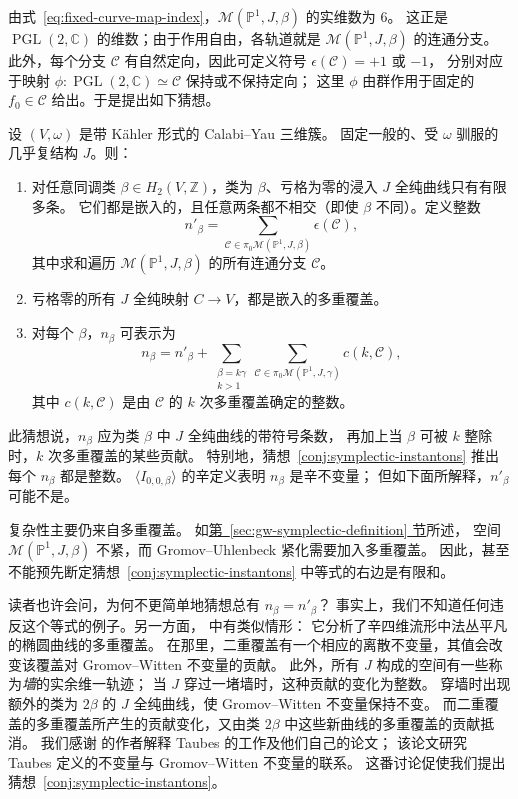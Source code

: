 由式~\eqref{eq:fixed-curve-map-index}，$\mathcal M(\mathbb P^1,J,\beta)$ 的实维数为 $6$。
这正是 $\operatorname{PGL}(2,\mathbb C)$ 的维数；由于作用自由，各轨道就是
$\mathcal M(\mathbb P^1,J,\beta)$ 的连通分支。
此外，每个分支 $\mathcal C$ 有自然定向，因此可定义符号 $\epsilon(\mathcal C)=+1$ 或 $-1$，
分别对应于映射 $\phi:\operatorname{PGL}(2,\mathbb C)\simeq\mathcal C$ 保持或不保持定向；
这里 $\phi$ 由群作用于固定的 $f_0\in\mathcal C$ 给出。于是提出如下猜想。
\begin{conjecture}\label{conj:symplectic-instantons}
设 $(V,\omega)$ 是带 Kähler 形式的 Calabi--Yau 三维簇。
固定一般的、受 $\omega$ 驯服的几乎复结构 $J$。则：
\begin{enumerate}[label=(\roman*)]
\item 对任意同调类 $\beta\in H_2(V,\mathbb Z)$，类为 $\beta$、亏格为零的浸入 $J$ 全纯曲线只有有限多条。
它们都是嵌入的，且任意两条都不相交（即使 $\beta$ 不同）。定义整数
\[
n'_\beta=\sum_{\mathcal C\in\pi_0\mathcal M(\mathbb P^1,J,\beta)}\epsilon(\mathcal C),
\]
其中求和遍历 $\mathcal M(\mathbb P^1,J,\beta)$ 的所有连通分支 $\mathcal C$。
\item 亏格零的所有 $J$ 全纯映射 $C\to V$，都是嵌入的多重覆盖。
\item 对每个 $\beta$，$n_\beta$ 可表示为
\[
n_\beta=n'_\beta+\sum_{\substack{\beta=k\gamma\\k>1}}
\sum_{\mathcal C\in\pi_0\mathcal M(\mathbb P^1,J,\gamma)}c(k,\mathcal C),
\]
其中 $c(k,\mathcal C)$ 是由 $\mathcal C$ 的 $k$ 次多重覆盖确定的整数。
\end{enumerate}
\end{conjecture}
此猜想说，$n_\beta$ 应为类 $\beta$ 中 $J$ 全纯曲线的带符号条数，
再加上当 $\beta$ 可被 $k$ 整除时，$k$ 次多重覆盖的某些贡献。
特别地，猜想~\ref{conj:symplectic-instantons} 推出每个 $n_\beta$ 都是整数。
$\langle I_{0,0,\beta}\rangle$ 的辛定义表明 $n_\beta$ 是辛不变量；
但如下面所解释，$n'_\beta$ 可能不是。

复杂性主要仍来自多重覆盖。
如\hyperref[sec:gw-symplectic-definition]{第~\ref*{sec:gw-symplectic-definition} 节}所述，
空间 $\mathcal M(\mathbb P^1,J,\beta)$ 不紧，而 Gromov--Uhlenbeck 紧化需要加入多重覆盖。
因此，甚至不能预先断定猜想~\ref{conj:symplectic-instantons} 中等式的右边是有限和。

读者也许会问，为何不更简单地猜想总有 $n_\beta=n'_\beta$？
事实上，我们不知道任何违反这个等式的例子。另一方面， 中有类似情形：
它分析了辛四维流形中法丛平凡的椭圆曲线的多重覆盖。
在那里，二重覆盖有一个相应的离散不变量，其值会改变该覆盖对 Gromov--Witten 不变量的贡献。
此外，所有 $J$ 构成的空间有一些称为\emph{墙}的实余维一轨迹；
当 $J$ 穿过一堵墙时，这种贡献的变化为整数。
穿墙时出现额外的类为 $2\beta$ 的 $J$ 全纯曲线，使 Gromov--Witten 不变量保持不变。
而二重覆盖的多重覆盖所产生的贡献变化，又由类 $2\beta$ 中这些新曲线的多重覆盖的贡献抵消。
我们感谢  的作者解释 Taubes 的工作及他们自己的论文；
该论文研究 Taubes 定义的不变量与 Gromov--Witten 不变量的联系。
这番讨论促使我们提出猜想~\ref{conj:symplectic-instantons}。


